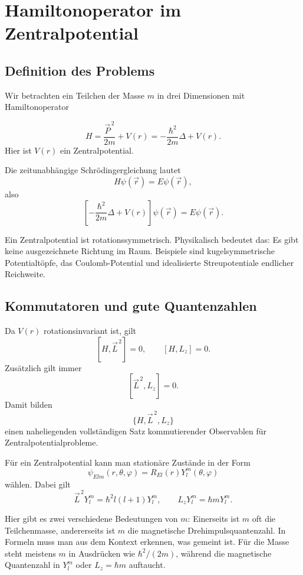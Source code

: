 \section{Hamiltonoperator im Zentralpotential}

\subsection{Definition des Problems}

Wir betrachten ein Teilchen der Masse \(m\) in drei Dimensionen mit Hamiltonoperator
\begin{definitionbox}
\[
    H = \frac{\vec P^{\,2}}{2m}+V(r)
    = -\frac{\hbar^2}{2m}\Delta + V(r).
\]
Hier ist \(V(r)\) ein Zentralpotential.
\end{definitionbox}

Die zeitunabhängige Schrödingergleichung lautet
\[
    H\psi(\vec r)=E\psi(\vec r),
\]
also
\[
    \left[-\frac{\hbar^2}{2m}\Delta+V(r)\right]\psi(\vec r)=E\psi(\vec r).
\]

\begin{notebox}
Ein Zentralpotential ist rotationssymmetrisch. Physikalisch bedeutet das: Es gibt keine ausgezeichnete Richtung im Raum. Beispiele sind kugelsymmetrische Potentialtöpfe, das Coulomb-Potential und idealisierte Streupotentiale endlicher Reichweite.
\end{notebox}

\subsection{Kommutatoren und gute Quantenzahlen}

Da \(V(r)\) rotationsinvariant ist, gilt
\[
    [H,\vec L^{\,2}]=0,
    \qquad
    [H,L_z]=0.
\]
Zusätzlich gilt immer
\[
    [\vec L^{\,2},L_z]=0.
\]
Damit bilden
\[
    \{H,\vec L^{\,2},L_z\}
\]
einen naheliegenden vollständigen Satz kommutierender Observablen für Zentralpotentialprobleme.

\begin{satzbox}
Für ein Zentralpotential kann man stationäre Zustände in der Form
\[
    \psi_{E l m}(r,\theta,\varphi)
    = R_{E l}(r)Y_l^m(\theta,\varphi)
\]
wählen. Dabei gilt
\[
    \vec L^{\,2}Y_l^m=\hbar^2l(l+1)Y_l^m,
    \qquad
    L_zY_l^m=\hbar mY_l^m.
\]
\end{satzbox}

\begin{warningbox}
Hier gibt es zwei verschiedene Bedeutungen von \(m\): Einerseits ist \(m\) oft die Teilchenmasse, andererseits ist \(m\) die magnetische Drehimpulsquantenzahl. In Formeln muss man aus dem Kontext erkennen, was gemeint ist. Für die Masse steht meistens \(m\) in Ausdrücken wie \(\hbar^2/(2m)\), während die magnetische Quantenzahl in \(Y_l^m\) oder \(L_z=\hbar m\) auftaucht.
\end{warningbox}

